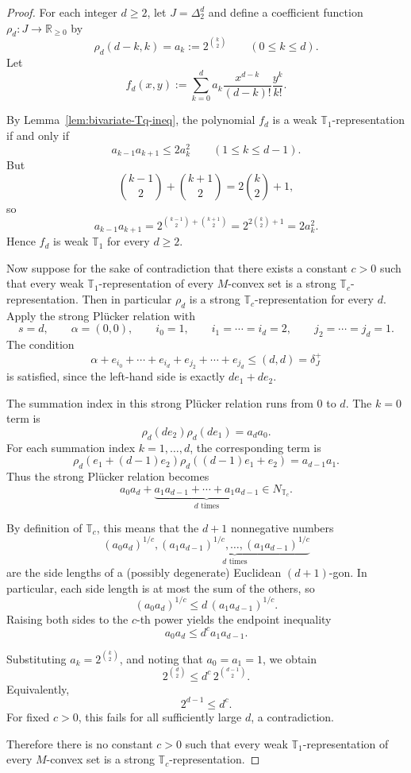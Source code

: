 \documentclass[12pt]{amsart}
\theoremstyle{definition}
\newcommand{\1}{\mathbf{1}}
\newcommand\R{{\mathbb R}}
\newcommand\T{{\mathbb T}}
\begin{document}
\begin{proof}
For each integer $d\ge 2$, let $J=\Delta_2^d$
and define a coefficient function $\rho_d:J\to \R_{\ge 0}$ by
\[
\rho_d(d-k,k)=a_k:=2^{\binom{k}{2}}
\qquad (0\le k\le d).
\]
Let
\[
f_d(x,y):=\sum_{k=0}^d a_k \frac{x^{d-k}}{(d-k)!}\frac{y^k}{k!}.
\]

By Lemma~\ref{lem:bivariate-Tq-ineq}, the polynomial $f_d$ is a weak $\T_1$-representation if
and only if
\[
a_{k-1}a_{k+1}\le 2a_k^2
\qquad (1\le k\le d-1).
\]
But
\[
\binom{k-1}{2}+\binom{k+1}{2}=2\binom{k}{2}+1,
\]
so
\[
a_{k-1}a_{k+1}
=
2^{\binom{k-1}{2}+\binom{k+1}{2}}
=
2^{2\binom{k}{2}+1}
=
2a_k^2.
\]
Hence $f_d$ is weak $\T_1$ for every $d\ge 2$.

Now suppose for the sake of contradiction that there exists a constant $c>0$
such that every weak $\T_1$-representation of every $M$-convex set is a strong
$\T_c$-representation. Then in particular $\rho_d$ is a strong
$\T_c$-representation for every $d$.
Apply the strong Pl\"ucker relation with
\[
s=d,\qquad \alpha=(0,0),\qquad i_0=1,\qquad i_1=\cdots=i_d=2,\qquad
j_2=\cdots=j_d=1.
\]
The condition
\[
\alpha+e_{i_0}+\cdots+e_{i_d}+e_{j_2}+\cdots+e_{j_d}\le (d,d)=\delta_J^+
\]
is satisfied, since the left-hand side is exactly $d e_1+d e_2$.

The summation index in this strong Pl\"ucker relation runs from $0$ to $d$.
The $k=0$ term is
\[
\rho_d(de_2)\rho_d(de_1)=a_d a_0.
\]
For each summation index $k=1,\dots,d$, the corresponding term is
\[
\rho_d(e_1+(d-1)e_2)\rho_d((d-1)e_1+e_2)=a_{d-1}a_1.
\]
Thus the strong Pl\"ucker
relation becomes
\[
a_0a_d+\underbrace{a_1a_{d-1}+\cdots+a_1a_{d-1}}_{d\text{ times}}\in N_{\T_c}.
\]

By definition of $\T_c$, this means that the $d+1$ nonnegative numbers
\[
(a_0a_d)^{1/c},\underbrace{(a_1a_{d-1})^{1/c},\dots,(a_1a_{d-1})^{1/c}}_{d\text{ times}}
\]
are the side lengths of a (possibly degenerate) Euclidean $(d+1)$-gon. In particular, each
side length is at most the sum of the others, so
\[
(a_0a_d)^{1/c}\le d\,(a_1a_{d-1})^{1/c}.
\]
Raising both sides to the $c$-th power yields the endpoint inequality
\[
a_0a_d\le d^c a_1a_{d-1}.
\]

Substituting $a_k=2^{\binom{k}{2}}$, and noting that $a_0=a_1=1$, we obtain
\[
2^{\binom{d}{2}}
\le
d^c\,2^{\binom{d-1}{2}}.
\]
Equivalently,
\[
2^{d-1}\le d^c.
\]
For fixed $c>0$, this fails for all sufficiently large $d$, a contradiction.

Therefore there is no constant $c>0$ such that every weak $\T_1$-representation of every
$M$-convex set is a strong $\T_c$-representation.
\end{proof}
\end{document}
